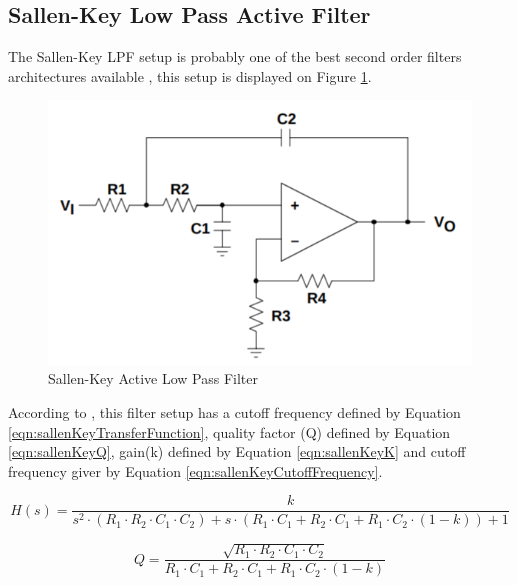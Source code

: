 	\subsection{Sallen-Key Low Pass Active Filter}
	
		The Sallen-Key LPF setup is probably one of the best second order filters architectures available \cite{dorfSvodoba2014}, this setup is displayed on Figure \ref{fig:sallenKeyLPF}.

		\begin{figure}[htbp]
			\centering
				\includegraphics[scale=0.6]{figuras/fig-sallenKeyLPF}
			\caption{Sallen-Key Active Low Pass Filter \cite{texas1999sallenkey}}
			\label{fig:sallenKeyLPF}
		\end{figure}

		According to \cite{texas1999sallenkey}, this filter setup has a cutoff frequency defined by Equation \ref{eqn:sallenKeyTransferFunction}, quality factor (Q) defined by Equation \ref{eqn:sallenKeyQ}, gain(k) defined by Equation \ref{eqn:sallenKeyK} and cutoff frequency giver by Equation \ref{eqn:sallenKeyCutoffFrequency}.

		\begin{equation}\label{eqn:sallenKeyTransferFunction}
			H(s)=\frac{k}{s^{2} \cdot \left( R_{1} \cdot R_{2} \cdot C_{1} \cdot C_{2} \right) + s \cdot \left( R_{1} \cdot C_{1} + R_{2} \cdot C_{1} + R_{1} \cdot C_{2} \cdot \left( 1 - k \right) \right) + 1} 
		\end{equation}

		\begin{equation}\label{eqn:sallenKeyQ}
			Q=\frac{\sqrt{R_{1} \cdot R_{2} \cdot C_{1} \cdot C_{2}}}{R_{1} \cdot C_{1} + R_{2} \cdot C_{1} + R_{1} \cdot C_{2} \cdot \left( 1 - k \right)}
		\end{equation}

